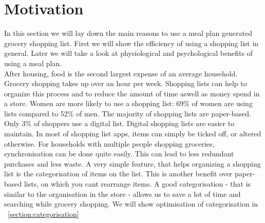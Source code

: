 
\chapter{Motivation}\label{chapter:motivation}

In this section we will lay down the main reasons to use a meal plan generated grocery shopping list. First we will show the efficiency of using a shopping list in general. Later we will take a look at physiological and psychological benefits of using a meal plan. \\

After housing, food is the second largest expense of an average household. Grocery shopping takes up over an hour per week. Shopping lists can help to organize this process and to reduce the amount of time aswell as money spend in a store.
Women are more likely to use a shopping list: 69\% of women are using lists compared to 52\% of men. The majority of shopping lists are paper-based. Only 3\% of shoppers use a digital list. Digital shopping lists are easier to maintain. 
In most of shopping list apps, items can simply be ticked off, or altered otherwise. For households with multiple people shopping groceries, synchronisation can be done quite easily. This can lead to less redundant purchases and less waste. A very simple feature, that helps organizing a shopping list is the categorisation of items on the list. This is another benefit over paper-based lists, on which you cant rearrange items. A good categorisation - that is similar to the organisation in the store - allows us to save a lot of time and searching while grocery shopping.
We will show optimisation of categorisation in ~\ref{section:categorisation} \\




